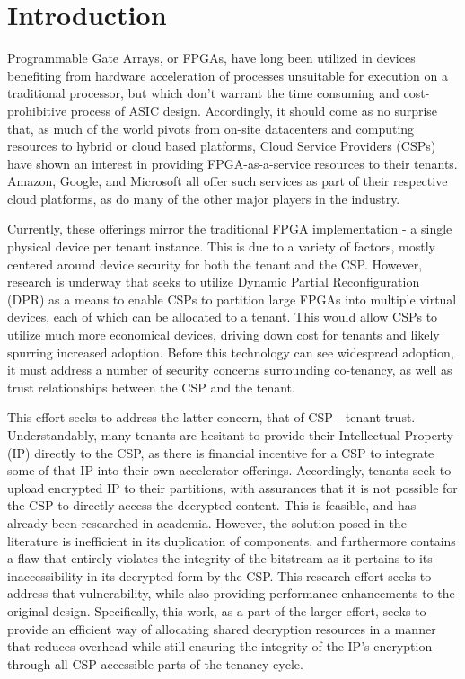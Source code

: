
\section{Introduction} \label{sec:introduction}

 Programmable Gate Arrays, or FPGAs, have long been utilized in devices benefiting from hardware acceleration of processes unsuitable for execution on a traditional processor, but which don't warrant the time consuming and cost-prohibitive process of ASIC design. Accordingly, it should come as no surprise that, as much of the world pivots from on-site datacenters and computing resources to hybrid or cloud based platforms, Cloud Service Providers (CSPs) have shown an interest in providing FPGA-as-a-service resources to their tenants. Amazon, Google, and Microsoft all offer such services as part of their respective cloud platforms, as do many of the other major players in the industry. 

Currently, these offerings mirror the traditional FPGA implementation - a single physical device per tenant instance. This is due to a variety of factors, mostly centered around device security for both the tenant and the CSP. However, research is underway that seeks to utilize Dynamic Partial Reconfiguration (DPR) as a means to enable CSPs to partition large FPGAs into multiple virtual devices, each of which can be allocated to a tenant. This would allow CSPs to utilize much more economical devices, driving down cost for tenants and likely spurring increased adoption. Before this technology can see widespread adoption, it must address a number of security concerns surrounding co-tenancy, as well as trust relationships between the CSP and the tenant.

This effort seeks to address the latter concern, that of CSP - tenant trust. Understandably, many tenants are hesitant to provide their Intellectual Property (IP) directly to the CSP, as there is financial incentive for a CSP to integrate some of that IP into their own accelerator offerings. Accordingly, tenants seek to upload encrypted IP to their partitions, with assurances that it is not possible for the CSP to directly access the decrypted content. This is feasible, and has already been researched in academia. However, the solution posed in the literature is inefficient in its duplication of components, and furthermore contains a flaw that entirely violates the integrity of the bitstream as it pertains to its inaccessibility in its decrypted form by the CSP. This research effort seeks to address that vulnerability, while also providing performance enhancements to the original design. Specifically, this work, as a part of the larger effort, seeks to provide an efficient way of allocating shared decryption resources in a manner that reduces overhead while still ensuring the integrity of the IP's encryption through all CSP-accessible parts of the tenancy cycle.

